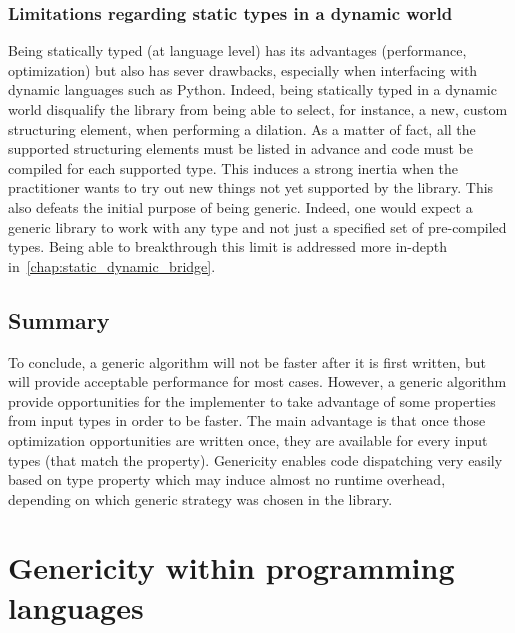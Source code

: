 \subsubsection{Limitations regarding static types in a dynamic world}

Being statically typed (at language level) has its advantages (performance, optimization) but also has sever drawbacks,
especially when interfacing with dynamic languages such as Python. Indeed, being statically typed in a dynamic world
disqualify the library from being able to select, for instance, a new, custom structuring element, when performing a
dilation. As a matter of fact, all the supported structuring elements must be listed in advance and code must be
compiled for each supported type. This induces a strong inertia when the practitioner wants to try out new things not
yet supported by the library. This also defeats the initial purpose of being generic. Indeed, one would expect a generic
library to work with any type and not just a specified set of pre-compiled types. Being able to breakthrough this limit
is addressed more in-depth in~\cref{chap:static_dynamic_bridge}.


\subsection{Summary}

To conclude, a generic algorithm will not be faster after it is first written, but will provide acceptable performance
for most cases. However, a generic algorithm provide opportunities for the implementer to take advantage of some
properties from input types in order to be faster. The main advantage is that once those optimization opportunities are
written once, they are available for every input types (that match the property). Genericity enables code dispatching
very easily based on type property which may induce almost no runtime overhead, depending on which generic strategy was
chosen in the library.


\section{Genericity within programming languages}
\label{sec:gen.genericity.within.programming.languages}

